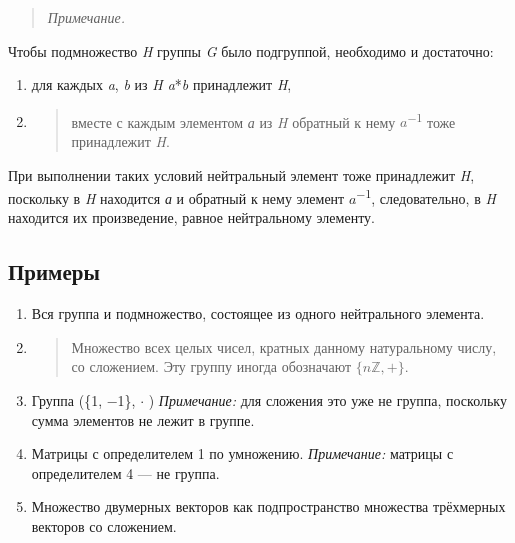 \documentclass[12pt]{article}
\begin{document}
    \begin{quote}
        \emph{Примечание.}
    \end{quote}

    Чтобы подмножество \emph{H} группы \emph{G} было подгруппой, необходимо
    и достаточно:

    \begin{enumerate}
        \def\labelenumi{\arabic{enumi}.}
        \item
              для каждых \emph{a}, \emph{b} из \emph{H a}*\emph{b} принадлежит
              \emph{H},
        \item
              \begin{quote}
                  вместе с каждым элементом \emph{а} из \emph{H} обратный к нему
                  $a$\textsuperscript{−1} тоже принадлежит \emph{H}.
              \end{quote}
    \end{enumerate}

    При выполнении таких условий нейтральный элемент тоже принадлежит
    \emph{H}, поскольку в \emph{H} находится \emph{а} и обратный к нему
    элемент $a$\textsuperscript{−1}, следовательно, в \emph{H} находится их
    произведение, равное нейтральному элементу.

    \subsection{Примеры}

    \begin{enumerate}
        \item
              Вся группа и подмножество, состоящее из одного нейтрального элемента.
        \item
              \begin{quote}
                  Множество всех целых чисел, кратных данному натуральному числу, со
                  сложением. Эту группу иногда обозначают $\{n\mathbb{Z}, +\}$.
              \end{quote}
        \item
              Группа (\{1, −1\}, $\cdot$ ) \emph{Примечание:} для сложения это уже не группа, поскольку сумма элементов не лежит в группе.
        \item
              Матрицы с определителем 1 по умножению. \emph{Примечание:} матрицы с
              определителем 4 --- не группа.
        \item
              Множество двумерных векторов как подпространство множества трёхмерных
              векторов со сложением.
    \end{enumerate}
\end{document}
